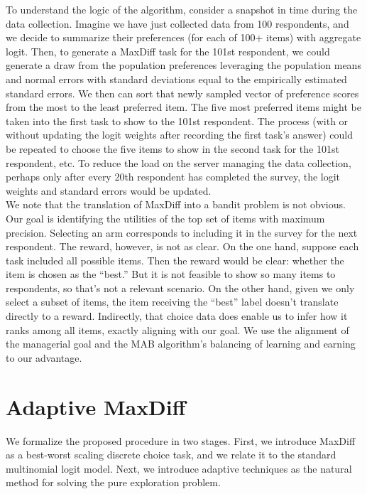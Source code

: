 \documentclass[nonblindrev]{informs3}
\begin{document}
To understand the logic of the algorithm, consider a snapshot in time during the data collection. Imagine we have just collected data from 100 respondents, and we decide to summarize their preferences (for each of 100+ items) with aggregate logit.  Then, to generate a MaxDiff task for the 101st respondent, we could generate a draw from the population preferences leveraging the population means and normal errors with standard deviations equal to the empirically estimated standard errors.  We then can sort that newly sampled vector of preference scores from the most to the least preferred item.  The five most preferred items might be taken into the first task to show to the 101st respondent.  The process (with or without updating the logit weights after recording the first task's answer) could be repeated to choose the five items to show in the second task for the 101st respondent, etc.  To reduce the load on the server managing the data collection, perhaps only after every 20th respondent has completed the survey, the logit weights and standard errors would be updated.\\
We note that the translation of MaxDiff into a bandit problem is not obvious. Our goal is identifying the utilities of the top set of items with maximum precision. Selecting an arm corresponds to including it in the survey for the next respondent. The reward, however, is not as clear. On the one hand, suppose each task included all possible items. Then the reward would be clear: whether the item is chosen as the ``best.'' But it is not feasible to show so many items to respondents, so that's not a relevant scenario. On the other hand, given we only select a subset of items, the item receiving the ``best'' label doesn't translate directly to a reward. Indirectly, that choice data does enable us to infer how it ranks among all items, exactly aligning with our goal. We use the alignment of the managerial goal and the MAB algorithm's balancing of learning and earning to our advantage.
\section{Adaptive MaxDiff}
We formalize the proposed procedure in two stages. First, we introduce MaxDiff as a best-worst scaling discrete choice task, and we relate it to the standard multinomial logit model. Next, we introduce adaptive techniques as the natural method for solving the pure exploration problem.
\end{document}
